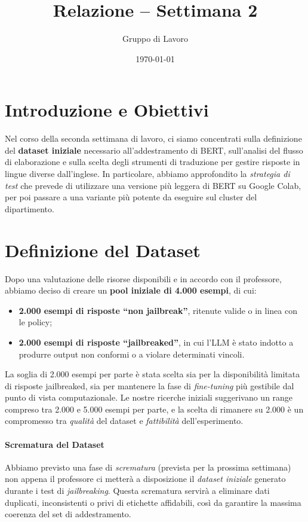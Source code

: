 \documentclass[a4paper,12pt]{article}
\title{Relazione -- Settimana 2}
\author{Gruppo di Lavoro}
\date{\today}
\begin{document}
\maketitle

\section*{Introduzione e Obiettivi}
Nel corso della seconda settimana di lavoro, ci siamo concentrati sulla definizione del \textbf{dataset iniziale} necessario all’addestramento di BERT, sull’analisi del flusso di elaborazione e sulla scelta degli strumenti di traduzione per gestire risposte in lingue diverse dall’inglese. In particolare, abbiamo approfondito la \emph{strategia di test} che prevede di utilizzare una versione più leggera di BERT su Google Colab, per poi passare a una variante più potente da eseguire sul cluster del dipartimento.

\section*{Definizione del Dataset}
Dopo una valutazione delle risorse disponibili e in accordo con il professore, abbiamo deciso di creare un \textbf{pool iniziale di 4.000 esempi}, di cui:
\begin{itemize}
    \item \textbf{2.000 esempi di risposte “non jailbreak”}, ritenute valide o in linea con le policy;
    \item \textbf{2.000 esempi di risposte “jailbreaked”}, in cui l’LLM è stato indotto a produrre output non conformi o a violare determinati vincoli.
\end{itemize}

La soglia di 2.000 esempi per parte è stata scelta sia per la disponibilità limitata di risposte jailbreaked, sia per mantenere la fase di \emph{fine-tuning} più gestibile dal punto di vista computazionale. Le nostre ricerche iniziali suggerivano un range compreso tra 2.000 e 5.000 esempi per parte, e la scelta di rimanere su 2.000 è un compromesso tra \emph{qualità} del dataset e \emph{fattibilità} dell’esperimento.

\paragraph{Scrematura del Dataset}
Abbiamo previsto una fase di \emph{scrematura} (prevista per la prossima settimana) non appena il professore ci metterà a disposizione il \emph{dataset iniziale} generato durante i test di \emph{jailbreaking}. Questa scrematura servirà a eliminare dati duplicati, inconsistenti o privi di etichette affidabili, così da garantire la massima coerenza del set di addestramento.
\end{document}
